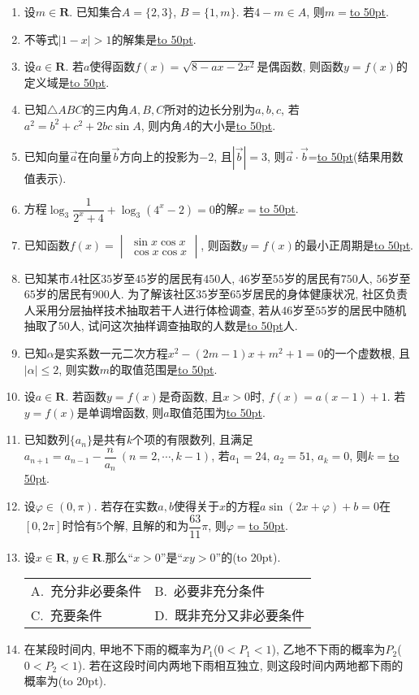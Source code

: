 \documentclass[10pt,a4paper]{article}
\newcommand{\blank}[1]{\underline{\hbox to #1pt{}}}
\newcommand{\bracket}[1]{(\hbox to #1pt{})}
\newcommand{\twoch}[4]{\par\begin{tabular}{p{.46\textwidth}p{.46\textwidth}}
A.~#1& B.~#2\\
C.~#3& D.~#4
\end{tabular}}
\begin{document}
\begin{enumerate}[1.]
\item 设$m\in \mathbf{R}$. 已知集合$A=\{2,3\}$, $B=\{1,m\}$. 若$4-m\in A$, 则$m=$\blank{50}.
\item 不等式$|1-x|>1$的解集是\blank{50}.
\item 设$a\in \mathbf{R}$. 若$a$使得函数$f(x)=\sqrt{8-ax-2x^2}$是偶函数, 则函数$y=f(x)$的定义域是\blank{50}.
\item 已知$\triangle ABC$的三内角$A,B,C$所对的边长分别为$a,b,c$, 若$a^2=b^2+c^2+2bc\sin A$, 则内角$A$的大小是\blank{50}.
\item 已知向量$\overrightarrow a$在向量$\overrightarrow b$方向上的投影为$-2$, 且$|\overrightarrow b|=3$, 则$\overrightarrow a\cdot \overrightarrow b$=\blank{50}(结果用数值表示).
\item 方程$\log_3\dfrac 1{2^x+4}+\log_3(4^x-2)=0$的解$x=$\blank{50}.
\item 已知函数$f(x)=\begin{vmatrix} \sin x  \cos x  \\ \cos x  \cos x  \end{vmatrix}$, 则函数$y=f(x)$的最小正周期是\blank{50}.
\item 已知某市$A$社区$35$岁至$45$岁的居民有$450$人, $46$岁至$55$岁的居民有$750$人, $56$岁至$65$岁的居民有$900$人. 为了解该社区$35$岁至$65$岁居民的身体健康状况, 社区负责人采用分层抽样技术抽取若干人进行体检调查, 若从$46$岁至$55$岁的居民中随机抽取了$50$人, 试问这次抽样调查抽取的人数是\blank{50}人.
\item 已知$\alpha$是实系数一元二次方程$x^2-(2m-1)x+m^2+1=0$的一个虚数根, 且$|\alpha|\le 2$, 则实数$m$的取值范围是\blank{50}.
\item 设$a\in \mathbf{R}$. 若函数$y=f(x)$是奇函数, 且$x>0$时, $f(x)=a(x-1)+1$. 若$y=f(x)$是单调增函数, 则$a$取值范围为\blank{50}.
\item 已知数列$\{a_n\}$是共有$k$个项的有限数列, 且满足$a_{n+1}=a_{n-1}-\dfrac n{a_n}\ (n=2,\cdots,k-1)$, 若$a_1=24$, $a_2=51$, $a_k=0$, 则$k=$\blank{50}.
\item 设$\varphi \in (0,\pi)$. 若存在实数$a,b$使得关于$x$的方程$a\sin (2x+\varphi)+b=0$在$[0,2\pi]$时恰有$5$个解, 且解的和为$\dfrac{63}{11}\pi$, 则$\varphi =$\blank{50}.
\item 设$x\in \mathbf{R}$, $y\in \mathbf{R}$.那么``$x>0$''是``$xy>0$''的\bracket{20}.
\twoch{充分非必要条件}{必要非充分条件}{充要条件}{既非充分又非必要条件}\item 在某段时间内, 甲地不下雨的概率为$P_1$($0<P_1<1$), 乙地不下雨的概率为$P_2$($0<P_2<1$). 若在这段时间内两地下雨相互独立, 则这段时间内两地都下雨的概率为\bracket{20}.

\end{enumerate}
\end{document}
